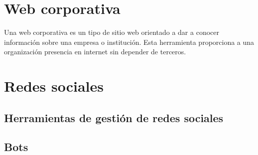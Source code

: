 \section{Web corporativa}
Una web corporativa es un tipo de sitio web orientado a dar a conocer información sobre una empresa o institución. Esta herramienta proporciona a una organización presencia en internet sin depender de terceros. 

\section{Redes sociales}

\subsection{Herramientas de gestión de redes sociales}
\cite{herramientas-social-media}

\subsection{Bots}
